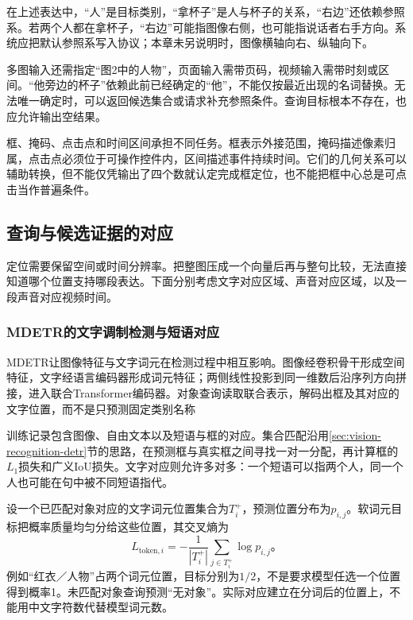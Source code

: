 在上述表达中，“人”是目标类别，“拿杯子”是人与杯子的关系，“右边”还依赖参照系。若两个人都在拿杯子，“右边”可能指图像右侧，也可能指说话者右手方向。系统应把默认参照系写入协议；本章未另说明时，图像横轴向右、纵轴向下。

多图输入还需指定“图2中的人物”，页面输入需带页码，视频输入需带时刻或区间。“他旁边的杯子”依赖此前已经确定的“他”，不能仅按最近出现的名词替换。无法唯一确定时，可以返回候选集合或请求补充参照条件。查询目标根本不存在，也应允许输出空结果。

框、掩码、点击点和时间区间承担不同任务。框表示外接范围，掩码描述像素归属，点击点必须位于可操作控件内，区间描述事件持续时间。它们的几何关系可以辅助转换，但不能仅凭输出了四个数就认定完成框定位，也不能把框中心总是可点击当作普遍条件。

\subsection{查询与候选证据的对应}
\label{sec:vision-understanding-grounding-match}

定位需要保留空间或时间分辨率。把整图压成一个向量后再与整句比较，无法直接知道哪个位置支持哪段表达。下面分别考虑文字对应区域、声音对应区域，以及一段声音对应视频时间。

\subsubsection{MDETR的文字调制检测与短语对应}
\label{sec:vision-understanding-mdetr}

MDETR让图像特征与文字词元在检测过程中相互影响。图像经卷积骨干形成空间特征，文字经语言编码器形成词元特征；两侧线性投影到同一维数后沿序列方向拼接，进入联合Transformer编码器。对象查询读取联合表示，解码出框及其对应的文字位置，而不是只预测固定类别名称

训练记录包含图像、自由文本以及短语与框的对应。集合匹配沿用\ref{sec:vision-recognition-detr}节的思路，在预测框与真实框之间寻找一对一分配，再计算框的$L_1$损失和广义IoU损失。文字对应则允许多对多：一个短语可以指两个人，同一个人也可能在句中被不同短语指代。

设一个已匹配对象对应的文字词元位置集合为$T_i^+$，预测位置分布为$p_{i,j}$。软词元目标把概率质量均匀分给这些位置，其交叉熵为
\begin{equation}
  L_{\mathrm{token},i}
  =-\frac{1}{|T_i^+|}\sum_{j\in T_i^+}\log p_{i,j}\text{。}
  \label{eq:vision-mdetr-token}
\end{equation}
例如“红衣／人物”占两个词元位置，目标分别为$1/2$，不是要求模型任选一个位置得到概率1。未匹配对象查询预测“无对象”。实际对应建立在分词后的位置上，不能用中文字符数代替模型词元数。

